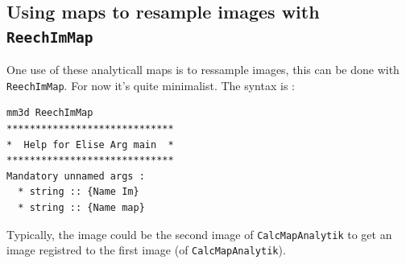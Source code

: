 
\subsection{Using maps to resample images with {\tt ReechImMap}}

\label{ReechImMap}

One use of these analyticall maps is to ressample images,
this can be done with {\tt  ReechImMap}. For now it's quite minimalist. 
The syntax is :

\begin{verbatim}
mm3d ReechImMap
*****************************
*  Help for Elise Arg main  *
*****************************
Mandatory unnamed args : 
  * string :: {Name Im}
  * string :: {Name map}
\end{verbatim}

Typically, the image could be the second image of {\tt CalcMapAnalytik} 
to get an image registred to the first image (of {\tt CalcMapAnalytik}).






